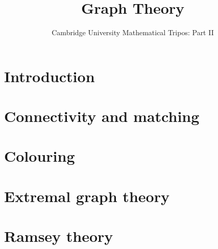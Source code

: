 \documentclass{article}
\title{Graph Theory}
\author{Cambridge University Mathematical Tripos: Part II}
\begin{document}
\maketitle

\tableofcontentsnewpage{}

\section{Introduction}

\section{Connectivity and matching}

\section{Colouring}

\section{Extremal graph theory}

\section{Ramsey theory}

\end{document}
